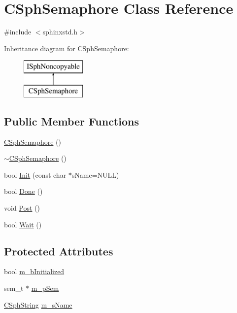 \hypertarget{classCSphSemaphore}{\section{C\-Sph\-Semaphore Class Reference}
\label{classCSphSemaphore}
}


{\ttfamily \#include $<$sphinxstd.\-h$>$}

Inheritance diagram for C\-Sph\-Semaphore\-:\begin{figure}[H]
\begin{center}
\leavevmode
\includegraphics[height=2.000000cm]{classCSphSemaphore}
\end{center}
\end{figure}
\subsection*{Public Member Functions}
\begin{DoxyCompactItemize}
\item 
\hyperlink{classCSphSemaphore_ae4a697d569766c707760d04249a275e3}{C\-Sph\-Semaphore} ()
\item 
\hyperlink{classCSphSemaphore_a9f371c9147e4eecf165def527e37c36b}{$\sim$\-C\-Sph\-Semaphore} ()
\item 
bool \hyperlink{classCSphSemaphore_a6d521424fd4a9944d4c6596d429edae0}{Init} (const char $\ast$s\-Name=N\-U\-L\-L)
\item 
bool \hyperlink{classCSphSemaphore_aade3a4d0f9ac76774749d7a5b2215075}{Done} ()
\item 
void \hyperlink{classCSphSemaphore_ae95fc54cc280e6c65dd70e217fb2adf2}{Post} ()
\item 
bool \hyperlink{classCSphSemaphore_a3a8d977bf51848e2fc790f80a3bf404c}{Wait} ()
\end{DoxyCompactItemize}
\subsection*{Protected Attributes}
\begin{DoxyCompactItemize}
\item 
bool \hyperlink{classCSphSemaphore_ac11c8343b8e40ad79df4ee44fa16a457}{m\-\_\-b\-Initialized}
\item 
sem\-\_\-t $\ast$ \hyperlink{classCSphSemaphore_a98492f0e838ab3d069ae81de77cb1e3c}{m\-\_\-p\-Sem}
\item 
\hyperlink{structCSphString}{C\-Sph\-String} \hyperlink{classCSphSemaphore_ac52319af197003fba722956df74f0ab9}{m\-\_\-s\-Name}
\end{DoxyCompactItemize}


